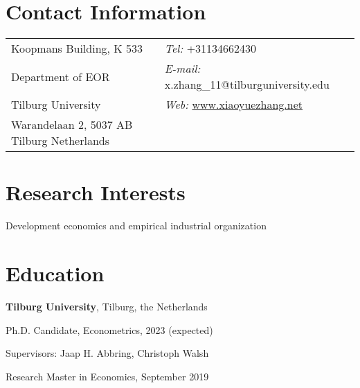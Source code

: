 \documentclass[margin,line]{res}
\newenvironment{list1}{
  \begin{list}{\ding{113}}{%
      \setlength{\itemsep}{0in}
      \setlength{\parsep}{0in} \setlength{\parskip}{0in}
      \setlength{\topsep}{0in} \setlength{\partopsep}{0in} 
      \setlength{\leftmargin}{0.17in}}}{\end{list}}
\newenvironment{list2}{
  \begin{list}{$\bullet$}{%
      \setlength{\itemsep}{0in}
      \setlength{\parsep}{0in} \setlength{\parskip}{0in}
      \setlength{\topsep}{0in} \setlength{\partopsep}{0in} 
      \setlength{\leftmargin}{0.2in}}}{\end{list}}
\begin{document}

\begin{resume}
\section{\sc Contact Information}
\vspace{.05in}
\begin{tabular}{@{}p{2in}p{4in}}
Koopmans Building, K 533     & {\it Tel:}  +31134662430 \\            
Department of EOR   &  {\it E-mail:}  x.zhang\_11@tilburguniversity.edu\\         
Tilburg University &{\it Web:} {\color{black} \url{www.xiaoyuezhang.net}} \\       
Warandelaan 2, 5037 AB Tilburg Netherlands  & \\     
\end{tabular}

\section{\sc Research Interests}
Development economics and empirical industrial organization

\section{\sc Education}
{\bf Tilburg University}, Tilburg, the Netherlands\\
\vspace*{-.1in}
\begin{list1}
\item[] Ph.D. Candidate, Econometrics, 2023 (expected) 
\vspace*{.05in}
\item[] Supervisors:  Jaap H. Abbring, Christoph Walsh
%
%
\vspace*{.05in}
\item[] Research Master in Economics,  September 2019
\end{list1}


\end{resume}
\end{document}
